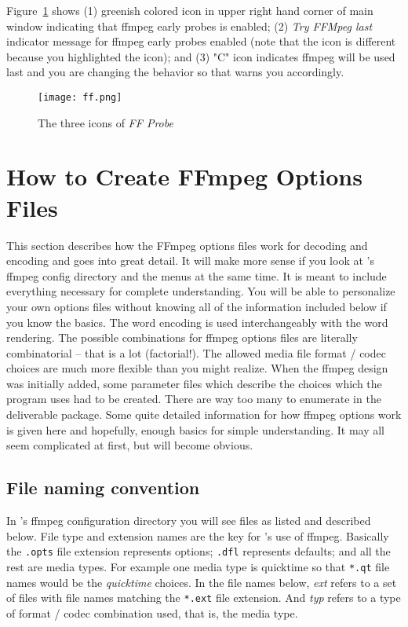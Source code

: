 Figure~\ref{fig:ff} shows (1) greenish colored icon in upper right hand corner of main window indicating
that ffmpeg early probes is enabled; (2) \textit{Try FFMpeg last}  indicator message for ffmpeg early probes enabled (note that the icon is different because you highlighted the icon); and (3) "C"  icon indicates ffmpeg will be used last and you are changing the behavior so that \CGG{} warns you accordingly.

\begin{figure}[htpb]
    \centering
    \texttt{[image: ff.png]}
    \caption{The three icons of \textit{FF Probe}}
    \label{fig:ff}
\end{figure}

\section{How to Create FFmpeg Options Files}%
\label{sec:create_ffmpeg_options_files}

This section describes how the FFmpeg options files work for decoding and encoding and goes into great detail.  It will make more sense if you look at \CGG{}'s ffmpeg config directory and the \CGG{} menus at the same time.  
It is meant to include everything necessary for complete understanding.  You will be able to personalize your own options files without knowing all of the information included below if you know the basics.  The word encoding is used interchangeably with the word rendering.
The possible combinations for ffmpeg options files are literally combinatorial -- that is a lot (factorial!).  The allowed media file format / codec choices are much more flexible than you might realize.  When the ffmpeg design was initially added, some parameter files which describe the choices which the program uses had to be created.  There are way too many to enumerate in the deliverable \CGG{} package.  Some quite detailed information for how ffmpeg options work is given here and hopefully, enough basics for simple understanding.  It may all seem complicated at first, but will become obvious.

\subsection{File naming convention}%
\label{sub:file_naming_convention}

In \CGG{}'s ffmpeg configuration directory you will see files as listed and described below.  File type and extension names are the key for \CGG{}'s use of ffmpeg.  Basically the \texttt{.opts} file extension represents options; \texttt{.dfl} represents defaults; and all the rest are media types.  For example one media type is quicktime so that \texttt{*.qt} file names would be the \textit{quicktime} choices.  In the file names below, \textit{ext} refers to a set of files with file names matching the \texttt{*.ext} file extension.  And \textit{typ} refers to a type of format / codec combination used, that is, the media type.

